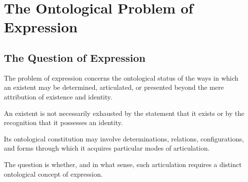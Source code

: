 %
%
%

\section{The Ontological Problem of Expression}
\label{sec:ontological-problem-of-expression}

\subsection{The Question of Expression}

The problem of expression concerns the ontological
status of the ways in which an existent may be
determined, articulated, or presented beyond
the mere attribution of existence and identity.

An existent is not necessarily exhausted by
the statement that it exists or by the recognition
that it possesses an identity.

Its ontological constitution may involve
determinations, relations, configurations,
and forms through which it acquires particular
modes of articulation.

The question is whether, and in what sense,
such articulation requires a distinct ontological
concept of expression.


